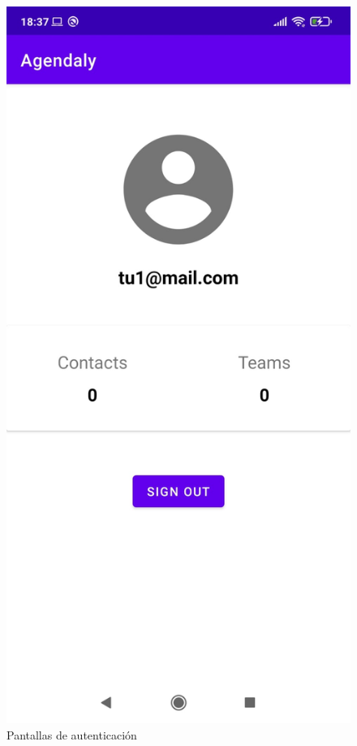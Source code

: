 \documentclass[a4paper,openright,12pt]{article}
\begin{document}
\begin{figure}
            \includegraphics[scale=0.05]{account_view.jpeg}
            \caption{Pantallas de autenticación}
        \end{figure}
\end{document}
